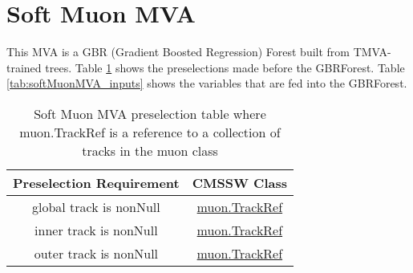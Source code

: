 \documentclass[11pt]{article}
\begin{document}
\section{Soft Muon MVA}
This MVA is a GBR (Gradient Boosted Regression) Forest built from TMVA-trained trees. Table \ref{tab:softMuonMVA_presel} shows the preselections made before the GBRForest. Table \ref{tab:softMuonMVA_inputs} shows the variables that are fed into the GBRForest. 

\begin{table}[H]
\centering
\begin{tabular}{ c | c }
Preselection  Requirement & CMSSW Class \\ \hline \hline
global track is nonNull & \href{https://github.com/cms-sw/cmssw/blob/bbac8f91da1cdddfbcb77c19b7ff519fadee878d/DataFormats/TrackReco/interface/TrackFwd.h}{muon.TrackRef} \\ \hline
inner track is nonNull & \href{https://github.com/cms-sw/cmssw/blob/bbac8f91da1cdddfbcb77c19b7ff519fadee878d/DataFormats/TrackReco/interface/TrackFwd.h}{muon.TrackRef} \\ \hline
outer track is nonNull & \href{https://github.com/cms-sw/cmssw/blob/bbac8f91da1cdddfbcb77c19b7ff519fadee878d/DataFormats/TrackReco/interface/TrackFwd.h}{muon.TrackRef}
\end{tabular}
\caption{Soft Muon MVA preselection table where muon.TrackRef is a reference to a collection of tracks in the muon class}
\label{tab:softMuonMVA_presel}
\end{table}
\end{document}
